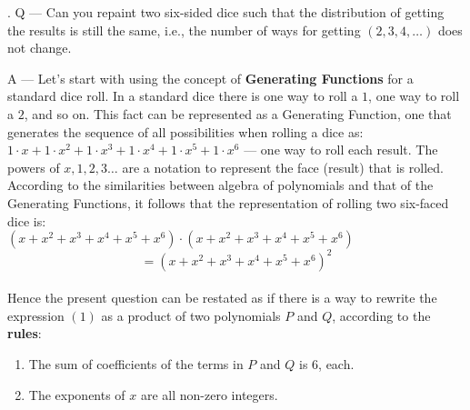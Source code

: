 \documentclass{article}
\newcounter{question}
\begin{document}
\newcommand\Que[1]{%
   \leavevmode\par
   \stepcounter{question}
   \noindent
   \thequestion. Q --- #1\par}

\newcommand\Ans[2][]{%
    \leavevmode\par\noindent
   {\leftskip37pt
    A --- \textbf{#1}#2\par}}

\Que{  
    Can you repaint two six-sided dice such that
    the distribution of getting the results 
    is still the same, i.e.,
    the number of ways for getting $(2, 3, 4, \dots)$ 
    does not change.
}
\Ans{
    Let's start with using the concept of \textbf{Generating Functions}
    for a standard dice roll. In a standard dice there is one way to roll a $1$, 
    one way to roll a $2$, and so on. This fact can be represented
    as a Generating Function, one that generates the sequence of
    all possibilities when rolling a dice as:\\

    $1 \cdot x + 1 \cdot x^2 + 1 \cdot x^3 + 1 \cdot x^4 + 1 \cdot x^5 + 1 \cdot x^6$
    — one way to roll each result. The powers of $x, 1, 2, 3 \dots$
    are a notation to represent the face (result) that is rolled.\\

    According to the similarities between algebra of polynomials 
    and that of the Generating Functions, it follows that the representation
    of rolling two six-faced dice is:\\

    $(x+x^2+x^3+x^4+x^5+x^6)\cdot(x+x^2+x^3+x^4+x^5+x^6)$\\
    
    \begin{equation}
        =(x+x^2+x^3+x^4+x^5+x^6)^2
    \end{equation}\\

    Hence the present question can be restated as if there
    is a way to rewrite the expression $(1)$ as a product of 
    two polynomials $P$ and $Q$, according to the \textbf{rules}:
    \begin{enumerate}
        \item The sum of coefficients of the terms in $P$ and $Q$ is $6$, each.
        \item The exponents of $x$ are all non-zero integers.\\
    \end{enumerate}

}
\end{document}

